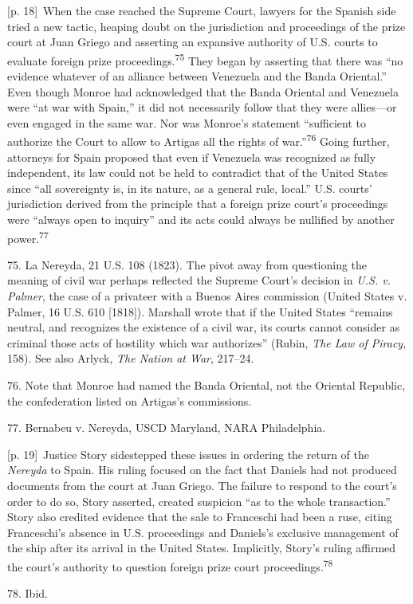 \documentclass[10pt,a4paper]{article}
\begin{document}
{\scriptsize\color{gray} [p. 18]}\ When the case reached the Supreme Court, lawyers for the Spanish side tried a new tactic, heaping doubt on the jurisdiction and proceedings of the prize court at Juan Griego and asserting an expansive authority of U.S. courts to evaluate foreign prize proceedings.\nobreak\textsuperscript{75} They began by asserting that there was “no evidence whatever of an alliance between Venezuela and the Banda Oriental.” Even though Monroe had acknowledged that the Banda Oriental and Venezuela were “at war with Spain,” it did not necessarily follow that they were allies—or even engaged in the same war. Nor was Monroe’s statement “sufficient to authorize the Court to allow to Artigas all the rights of war.”\nobreak\textsuperscript{76} Going further, attorneys for Spain proposed that even if Venezuela was recognized as fully independent, its law could not be held to contradict that of the United States since “all sovereignty is, in its nature, as a general rule, local.” U.S. courts’ jurisdiction derived from the principle that a foreign prize court’s proceedings were “always open to inquiry” and its acts could always be nullified by another power.\nobreak\textsuperscript{77}\par{\small 75. La Nereyda, 21 U.S. 108 (1823). The pivot away from questioning the meaning of civil war perhaps reflected the Supreme Court’s decision in \textit{U.S. v. Palmer}, the case of a privateer with a Buenos Aires commission (United States v. Palmer, 16 U.S. 610 [1818]). Marshall wrote that if the United States “remains neutral, and recognizes the existence of a civil war, its courts cannot consider as criminal those acts of hostility which war authorizes” (Rubin, \textit{The Law of Piracy}, 158). See also Arlyck, \textit{The Nation at War}, 217–24.\par}{\small 76. Note that Monroe had named the Banda Oriental, not the Oriental Republic, the confederation listed on Artigas’s commissions.\par}{\small 77. Bernabeu v. Nereyda, USCD Maryland, NARA Philadelphia.\par}
{\scriptsize\color{gray} [p. 19]}\ Justice Story sidestepped these issues in ordering the return of the \textit{Nereyda} to Spain. His ruling focused on the fact that Daniels had not produced documents from the court at Juan Griego. The failure to respond to the court’s order to do so, Story asserted, created suspicion “as to the whole transaction.” Story also credited evidence that the sale to Franceschi had been a ruse, citing Franceschi’s absence in U.S. proceedings and Daniels’s exclusive management of the ship after its arrival in the United States. Implicitly, Story’s ruling affirmed the court’s authority to question foreign prize court proceedings.\nobreak\textsuperscript{78}\par{\small 78. Ibid.\par}
\end{document}

